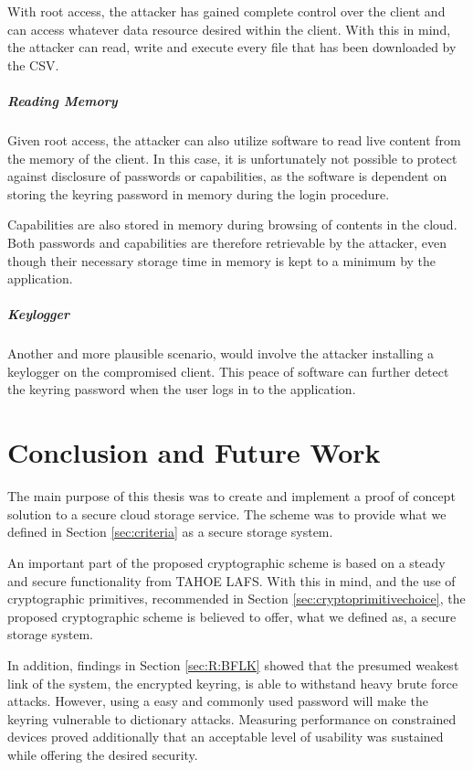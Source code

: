 \documentclass[pdftex,english,10pt,b5paper,twoside]{book}
\begin{document}
With root access, the attacker has gained complete control over the client and
can access whatever data resource desired within the client. With this in mind,
the attacker can read, write and execute every file that has been downloaded by
the \acl{CSV}.

\paragraph{Reading Memory} Given root access, the attacker can also utilize
software to read live content from the memory of the client. In this case, it
is unfortunately not possible to protect against disclosure of passwords or
capabilities, as the software is dependent on storing the keyring password in
memory during the login procedure.

Capabilities are also stored in memory during browsing of contents in the
cloud. Both passwords and capabilities are therefore retrievable by the
attacker, even though their necessary storage time in memory is kept to a
minimum by the application. 

\paragraph{Keylogger} Another and more plausible scenario, would involve the
attacker installing a keylogger on the compromised client. This peace of
software can further detect the keyring password when the user logs in to the
application.

\chapter{Conclusion and Future Work}
\label{ch:conclusion}
The main purpose of this thesis was to create and implement a proof of concept
solution to a secure cloud storage service. The scheme was to provide what we
defined in Section \ref{sec:criteria} as a secure storage system. 

An important part of the proposed cryptographic scheme is based on a steady and
secure functionality from TAHOE LAFS. With this in mind, and the use of
cryptographic primitives, recommended in Section \ref{sec:cryptoprimitivechoice}, the proposed
cryptographic scheme is believed to offer, what we defined as, a secure
storage system. 

In addition, findings in Section \ref{sec:R:BFLK} showed that the presumed weakest link of
the system, the encrypted keyring, is able to withstand heavy brute force attacks. However,
using a easy and commonly used password will make the keyring vulnerable to
dictionary attacks. Measuring performance on constrained devices proved additionally that an
acceptable level of usability was sustained while offering the desired security.
\end{document}
